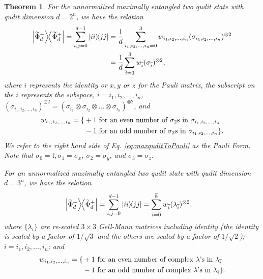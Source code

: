 \documentclass[12pt]{iopart}
\newtheorem{theorem}{Theorem}
\begin{document}
\begin{theorem}\label{thm:maxquditToPauli}
    For the unnormalized maximally entangled two qudit state with qudit dimension $d=2^{n}$, 
    we have the relation
    \begin{align}\label{eq:maxquditToPauli}
        \notag\op{\widetilde\Phi^+_{d}}=\sum_{i,j=0}^{d-1}\op{ii}{jj}&=\dfrac{1}{d}\sum_{i_1,i_2,...,i_{n}=0}^{3}w_{i_1,i_2,...,i_{n}}(\sigma_{i_1,i_2,...,i_{n}})^{\otimes 2}\\
        &=\dfrac{1}{d}\sum_{\overline{i}=0}^{3}w_{\overline i}(\sigma_{\overline{i}})^{\otimes 2},
    \end{align}
    where $i$ represents the identity or $x, y$ or $z$ for the Pauli matrix, the subscript on the $i$ represents the subspace, $\overline i=i_1,i_2,...,i_{n}$, $(\sigma_{i_1,i_2,...,i_{n}})^{\otimes 2}=(\sigma_{i_1}\otimes \sigma_{i_2}\otimes...\otimes\sigma_{i_{n}})^{\otimes 2}$, and 
    \begin{align}
        \notag w_{i_1,i_2,...,i_{n}}=\{&+1\text{ for an even number of $\sigma_2$s in $\sigma_{i_1,i_2,...,i_{n}}$}\\
                &-1 \text{ for an odd number of $\sigma_2$s in $\sigma_{i_1,i_2,...,i_{n}}$}\}.
    \end{align}
    We refer to the right hand side of Eq. \eqref{eq:maxquditToPauli} as the Pauli Form. Note that $\sigma_0=\mathbb{I}, \sigma_1=\sigma_x$, $\sigma_2=\sigma_y$, and $\sigma_3=\sigma_z$.
    
    For an unnormalized maximally entangled two qudit state with qudit dimension $d=3^{n}$, we have the relation 
    \begin{align}\label{eq:maxquditToGellman}
        \op{\widetilde\Phi^+_{d}}=\sum_{i,j=0}^{d-1}\op{ii}{jj}&=\sum_{\overline{i}=\overline 0}^{\overline 8}w_{\overline i}(\lambda_{\overline{i}})^{\otimes 2},
    \end{align}
    where $\{\lambda_i\}$ are re-scaled $3\times 3$ Gell-Mann matrices including identity (the identity is scaled by a factor of $1/\sqrt{3}$ and the others are scaled by a factor of $1/\sqrt{2}$); $\overline i=i_1,i_2,...,i_{n}$; and
    \begin{align}
        \notag w_{i_1,i_2,...,i_{n}}=\{&+1\text{ for an even number of complex $\lambda$'s in $\lambda_{\overline i}$}\\
                &-1 \text{ for an odd number of complex $\lambda$'s in $\lambda_{\overline i}$}\}.
    \end{align}
\end{theorem}
\end{document}
